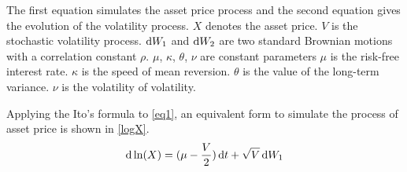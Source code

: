 \documentclass{ws-ijfe}
\begin{document}
 The first equation simulates the asset price process and the second equation gives the evolution of the volatility process. $X$ denotes the asset price. $V$ is the stochastic volatility process. $\mathrm{d} W_1$ and $\mathrm{d} W_2$ are two standard Brownian motions with a correlation constant $\rho$. $\mu$, $\kappa$, $\theta$, $\nu$ are constant parameters $\mu$ is the risk-free interest rate. $\kappa$ is the speed of mean reversion. $\theta$ is the value of the long-term variance. $\nu$ is the volatility of volatility.


Applying the Ito's formula to \eqref{eq1}, an equivalent form to simulate the process of asset price is shown in \eqref{logX}.
\begin{equation}\label{logX}
  \d\ln(X)=(\mu-\frac{V}{2})\,\d t+\sqrt{V}\,\d W_1
\end{equation}
\end{document}
